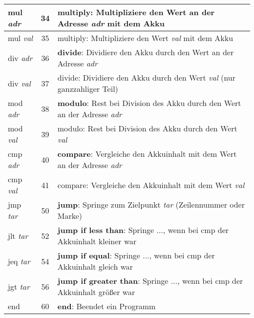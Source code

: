 \documentclass[loesung]{schulein}
\begin{document}
\begin{table}[H]
\begin{tabularx}{\textwidth}{|l|c|X|}
\hline 
\rule[-1ex]{0pt}{2.5ex} mul \textit{adr} & 34 & \textbf{multiply}: Multipliziere den Wert an der Adresse \textit{adr} mit dem Akku \\ 
\hline 
\rule[-1ex]{0pt}{2.5ex} mul \textit{val} & 35 & multiply: Multipliziere den Wert \textit{val} mit dem Akku \\ 
\hline 
\rule[-1ex]{0pt}{2.5ex} div \textit{adr} & 36 & \textbf{divide}: Dividiere den Akku durch den Wert an der Adresse \textit{adr} \\ 
\hline 
\rule[-1ex]{0pt}{2.5ex} div \textit{val} & 37 & divide: Dividiere den Akku durch den Wert \textit{val} (nur ganzzahliger Teil) \\ 
\hline 
\rule[-1ex]{0pt}{2.5ex} mod \textit{adr} & 38 &  \textbf{modulo}: Rest bei Division des Akku durch den Wert an der Adresse \textit{adr}\\ 
\hline 
\rule[-1ex]{0pt}{2.5ex} mod  \textit{val} & 39 & modulo: Rest bei Division des Akku durch den Wert \textit{val} \\ 
\hline 
\rule[-1ex]{0pt}{2.5ex} cmp \textit{adr} & 40 & \textbf{compare}: Vergleiche den Akkuinhalt mit dem Wert an der Adresse \textit{adr} \\ 
\hline 
\rule[-1ex]{0pt}{2.5ex} cmp  \textit{val} & 41 & compare: Vergleiche den Akkuinhalt mit dem Wert \textit{val} \\ 
\hline 
\rule[-1ex]{0pt}{2.5ex} jmp \textit{tar} & 50 & \textbf{jump}: Springe zum Zielpunkt \textit{tar} (Zeilennummer oder Marke) \\ 
\hline 
\rule[-1ex]{0pt}{2.5ex} jlt	\textit{tar} & 52 & \textbf{jump if less than}: Springe ..., wenn bei cmp der Akkuinhalt kleiner war \\ 
\hline 
\rule[-1ex]{0pt}{2.5ex} jeq \textit{tar} & 54 & \textbf{jump if equal}: Springe ..., wenn bei cmp der Akkuinhalt gleich war\\ 
\hline 
\rule[-1ex]{0pt}{2.5ex} jgt \textit{tar} & 56 & \textbf{jump if greater than}: Springe ..., wenn bei cmp der Akkuinhalt größer war \\ 
\hline 
\rule[-1ex]{0pt}{2.5ex} end & 60 & \textbf{end}: Beendet ein Programm \\ 
\hline 
\end{tabularx} 
\end{table}
\end{document}
